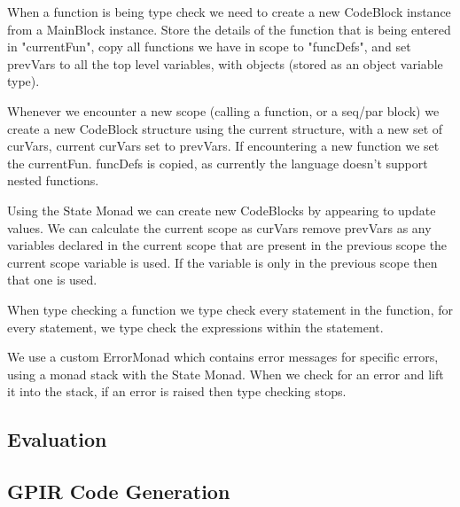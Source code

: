 When a function is being type check we need to create a new CodeBlock instance
from a MainBlock instance. Store the details of the function that is being entered
in "currentFun", copy all functions we have in scope to "funcDefs", and set prevVars
to all the top level variables, with objects (stored as an object variable type).


Whenever we encounter a new scope (calling a function, or a seq/par block)
we create a new CodeBlock structure using the current structure, with a new set
of curVars, current curVars set to prevVars. If encountering a new function
we set the currentFun. funcDefs is copied, as currently the language doesn't support
nested functions.   

Using the State Monad we can create new CodeBlocks by appearing to update values.
We can calculate the current scope as curVars remove prevVars as any variables declared
in the current scope that are present in the previous scope the current scope variable is used.
If the variable is only in the previous scope then that one is used.

When type checking a function we type check every statement in the function,
for every statement, we type check the expressions within the statement.

We use a custom ErrorMonad which contains error messages for specific errors,
using a monad stack with the State Monad. When we check for an error and lift
it into the stack, if an error is raised then type checking stops.

\subsection{Evaluation}
\subsection{GPIR Code Generation}
